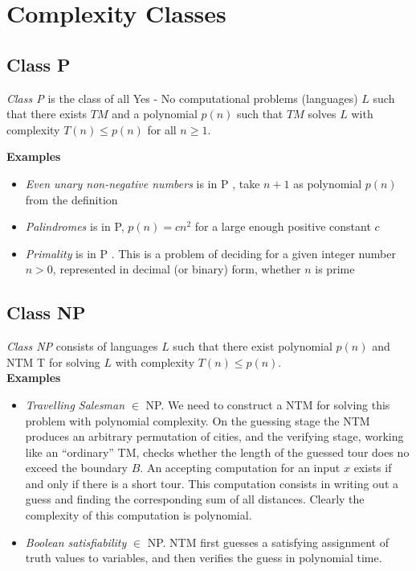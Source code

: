 \section{Complexity Classes}
\subsection{Class P}
\begin{definition}
    \textit{Class P} is the class of all Yes - No computational problems
    (languages) $L$ such that there exists $TM$ and a polynomial $p(n)$ such that
    $TM$ solves $L$ with complexity $T(n) \leq p(n)$ for all $n \geq 1$.
\end{definition}
\textbf{Examples}
\begin{itemize}
    \item \textit{Even unary non-negative numbers} is in P , take $n + 1$ as polynomial $p(n)$ from the definition
    \item \textit{Palindromes} is in P, $p(n) = cn^2$ for a large enough positive constant $c$
    \item \textit{Primality} is in P . This is a problem of deciding for a given integer number $n > 0$,
        represented in decimal (or binary) form, whether $n$ is prime
\end{itemize}

\subsection{Class NP}
\begin{definition}
    \textit{Class NP} consists of languages $L$ such that
    there exist polynomial $p(n)$ and NTM T for solving $L$
    with complexity $T(n) \leq p(n)$.\\

    \textbf{Examples}
    \begin{itemize}
        \item \textit{Travelling Salesman} $\in$ NP.
            We need to construct a NTM for solving this problem with polynomial complexity.
            On the guessing stage the NTM produces an arbitrary permutation of cities,
            and the verifying stage, working like an “ordinary” TM,
            checks whether the length of the guessed tour does no exceed the boundary $B$.
            An accepting computation for an input $x$ exists if and only if there is a short tour.
            This computation consists in writing out a guess and finding the corresponding sum of all distances.
            Clearly the complexity of this computation is polynomial.
        \item \textit{Boolean satisfiability} $\in$ NP.
            NTM first guesses a satisfying assignment of truth values to variables,
            and then verifies the guess in polynomial time.
    \end{itemize}
\end{definition}

